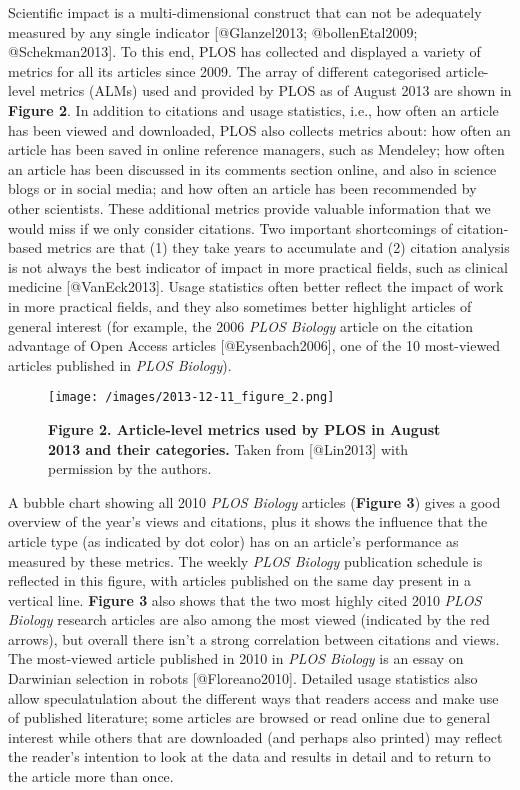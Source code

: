 Scientific impact is a multi-dimensional construct that can not be
adequately measured by any single indicator {[}@Glanzel2013;
@bollenEtal2009; @Schekman2013{]}. To this end, PLOS has collected and
displayed a variety of metrics for all its articles since 2009. The
array of different categorised article-level metrics (ALMs) used and
provided by PLOS as of August 2013 are shown in \textbf{Figure 2}. In
addition to citations and usage statistics, i.e., how often an article
has been viewed and downloaded, PLOS also collects metrics about: how
often an article has been saved in online reference managers, such as
Mendeley; how often an article has been discussed in its comments
section online, and also in science blogs or in social media; and how
often an article has been recommended by other scientists. These
additional metrics provide valuable information that we would miss if we
only consider citations. Two important shortcomings of citation-based
metrics are that (1) they take years to accumulate and (2) citation
analysis is not always the best indicator of impact in more practical
fields, such as clinical medicine {[}@VanEck2013{]}. Usage statistics
often better reflect the impact of work in more practical fields, and
they also sometimes better highlight articles of general interest (for
example, the 2006 \emph{PLOS Biology} article on the citation advantage
of Open Access articles {[}@Eysenbach2006{]}, one of the 10 most-viewed
articles published in \emph{PLOS Biology}).

\begin{figure}[htbp]
\centering
\texttt{[image: /images/2013-12-11\_figure\_2.png]}
\caption{\textbf{Figure 2. Article-level metrics used by PLOS in August
2013 and their categories.} Taken from {[}@Lin2013{]} with permission by
the authors.}
\end{figure}

A bubble chart showing all 2010 \emph{PLOS Biology} articles
(\textbf{Figure 3}) gives a good overview of the year's views and
citations, plus it shows the influence that the article type (as
indicated by dot color) has on an article's performance as measured by
these metrics. The weekly \emph{PLOS Biology} publication schedule is
reflected in this figure, with articles published on the same day
present in a vertical line. \textbf{Figure 3} also shows that the two
most highly cited 2010 \emph{PLOS Biology} research articles are also
among the most viewed (indicated by the red arrows), but overall there
isn't a strong correlation between citations and views. The most-viewed
article published in 2010 in \emph{PLOS Biology} is an essay on
Darwinian selection in robots {[}@Floreano2010{]}. Detailed usage
statistics also allow speculatulation about the different ways that
readers access and make use of published literature; some articles are
browsed or read online due to general interest while others that are
downloaded (and perhaps also printed) may reflect the reader's intention
to look at the data and results in detail and to return to the article
more than once.

